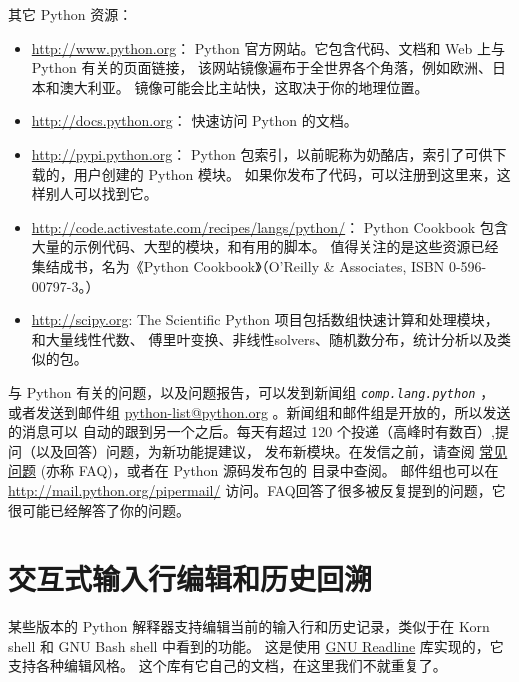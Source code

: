 \documentclass[a4paper,10pt,english]{sphinxmanual}
\begin{document}
其它 Python 资源：
\begin{itemize}
\item {} 
\href{http://www.python.org}{http://www.python.org}： Python 官方网站。它包含代码、文档和 Web 上与 Python 有关的页面链接，
该网站镜像遍布于全世界各个角落，例如欧洲、日本和澳大利亚。
镜像可能会比主站快，这取决于你的地理位置。

\item {} 
\href{http://docs.python.org}{http://docs.python.org}： 快速访问 Python 的文档。

\item {} 
\href{http://pypi.python.org}{http://pypi.python.org}： Python 包索引，以前昵称为奶酪店，索引了可供下载的，用户创建的 Python 模块。
如果你发布了代码，可以注册到这里来，这样别人可以找到它。

\item {} 
\href{http://code.activestate.com/recipes/langs/python/}{http://code.activestate.com/recipes/langs/python/}： Python Cookbook 包含大量的示例代码、大型的模块，和有用的脚本。
值得关注的是这些资源已经集结成书，名为《Python Cookbook》（O’Reilly \& Associates, ISBN 0-596-00797-3。）

\item {} 
\href{http://scipy.org}{http://scipy.org}: The Scientific Python 项目包括数组快速计算和处理模块，和大量线性代数、
傅里叶变换、非线性solvers、随机数分布，统计分析以及类似的包。

\end{itemize}

与 Python 有关的问题，以及问题报告，可以发到新闻组 \emph{\texttt{comp.lang.python}} ，
或者发送到邮件组 \href{mailto:python-list@python.org}{python-list@python.org} 。新闻组和邮件组是开放的，所以发送的消息可以
自动的跟到另一个之后。每天有超过 120 个投递（高峰时有数百）,提问（以及回答）问题，为新功能提建议，
发布新模块。在发信之前，请查阅 \href{http://www.python.org/doc/faq/}{常见问题} (亦称 FAQ)，或者在 Python 源码发布包的  目录中查阅。
邮件组也可以在 \href{http://mail.python.org/pipermail/}{http://mail.python.org/pipermail/} 访问。FAQ回答了很多被反复提到的问题，它很可能已经解答了你的问题。


\chapter{交互式输入行编辑和历史回溯}
\label{interactive:id1}\label{interactive::doc}\label{interactive:tut-interacting}
某些版本的 Python 解释器支持编辑当前的输入行和历史记录，类似于在 Korn shell 和 GNU Bash shell 中看到的功能。
这是使用 \href{http://tiswww.case.edu/php/chet/readline/rltop.html}{GNU Readline} 库实现的，它支持各种编辑风格。 这个库有它自己的文档，在这里我们不就重复了。
\end{document}
